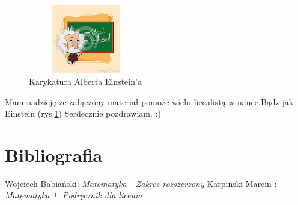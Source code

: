 \documentclass[12pt,a4paper]{article}
\begin{document}
\begin{figure}
\centering
\includegraphics[width=5cm,height=3cm]{einstein}
\caption{Karykatura Alberta Einstein'a}
\label{fig:obrazek einstein}
\end{figure}

\center Mam nadzieję że załączony materiał pomoże wielu licealistą w nauce.Bądz jak Einstein (rys.\ref{fig:obrazek einstein})
\center Serdecznie pozdrawiam. :)




\section{Bibliografia}

\begin{thebibliography}{9}
Wojciech Babiański: \emph{Matematyka - Zakres rozszerzony}
Karpiński Marcin : \emph{Matematyka 1. Podręcznik dla liceum}

\end{thebibliography}
\end{document}
